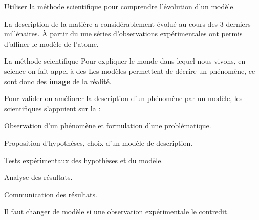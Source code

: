\sndEnTeteTrois

\vspace*{-36pt}


\begin{objectifs}
  \item Utiliser la méthode scientifique pour comprendre l'évolution d'un modèle.
\end{objectifs}

\begin{contexte}
  La description de la matière a considérablement évolué au cours des 3 derniers millénaires.
  \`A partir du  une séries d'observations expérimentales ont permis d'affiner le modèle de l'atome.
  
\end{contexte}


\begin{doc}{La méthode scientifique}
  Pour expliquer le monde dans lequel nous vivons, en science on fait appel à des  
  Les modèles permettent de décrire un phénomène, ce sont donc des \textbf{image} de la réalité.

  Pour valider ou améliorer la description d'un phénomène par un modèle, les scientifiques s'appuient sur la  :
  \begin{enumeration}
    \item Observation d'un phénomène et formulation d'une problématique.
    \item Proposition d'hypothèses, choix d'un modèle de description.
    \item Tests expérimentaux des hypothèses et du modèle.
    \item Analyse des résultats.
    \item Communication des résultats.
  \end{enumeration}

  \flecheLongue Il faut changer de modèle si une observation expérimentale le contredit.
\end{doc}


